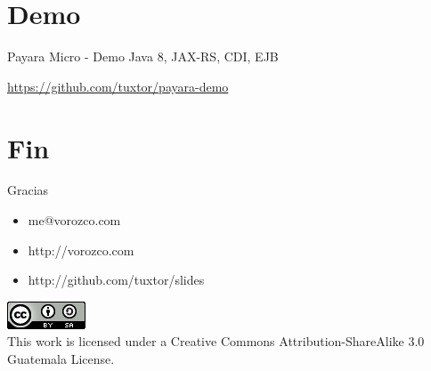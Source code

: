 \documentclass{beamer}
\begin{document}
\section{Demo}
\begin{frame}{Payara Micro - Demo}
\huge Java 8, JAX-RS, CDI, EJB

\normalsize  \url{https://github.com/tuxtor/payara-demo}
\end{frame}

\section{Fin}
\begin{frame}{Gracias}
\begin{itemize}
\item me@vorozco.com
\item http://vorozco.com
\item http://github.com/tuxtor/slides
\end{itemize}
\begin{center}
\includegraphics[width=0.1\linewidth]{Images/cclogo}
\\
This work is licensed under a Creative Commons Attribution-ShareAlike 3.0 Guatemala License.
\end{center}
\end{frame}
\end{document}

